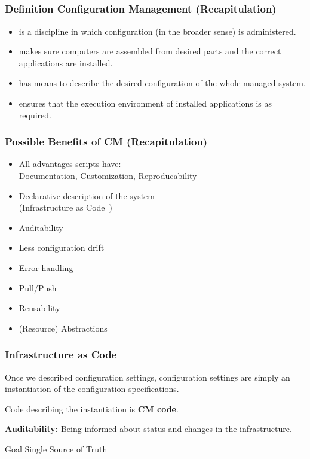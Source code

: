 \subsection{}

\begin{frame}
	\frametitle{Definition Configuration Management (Recapitulation)}

	\pause

	\begin{itemize}
	\item is a discipline in which configuration (in the broader sense) is administered.
	\item makes sure computers are assembled from desired parts and the correct applications are installed.
	\item has means to describe the desired configuration of the whole managed system.
	\item ensures that the execution environment of installed applications is as required.
	\end{itemize}
\end{frame}

\begin{frame}
	\frametitle{Possible Benefits of CM (Recapitulation)}

	\pause

	\begin{itemize} %
	\item All advantages scripts have: \\
		Documentation, Customization, Reproducability
	\item Declarative description of the system \\
		(Infrastructure as Code~\cite{waldemar2013testing})
	\item Auditability
	\item Less configuration drift
	\item Error handling
	\item Pull/Push
	\item Reusability
	\item (Resource) Abstractions
	\end{itemize}
\end{frame}

\begin{frame}
	\frametitle{Infrastructure as Code}

	Once we described configuration settings,
	configuration settings are simply an instantiation of the configuration specifications.
	\vspace{1em}

	Code describing the instantiation is \textbf{CM code}.
	\vspace{1em}

	\textbf{Auditability:}
	Being informed about status and changes in the infrastructure.
	\vspace{1em}

	\begin{alertblock}{Goal}
	Single Source of Truth
	\end{alertblock}
\end{frame}

